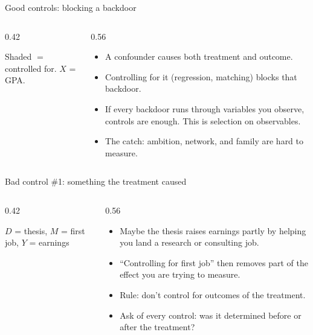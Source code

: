 \documentclass[aspectratio=169,11pt]{beamer}
\begin{document}
\begin{frame}{Good controls: blocking a backdoor}
\begin{columns}
\begin{column}{0.42\textwidth}
\begin{center}
\end{center}
\smallskip
{\small Shaded $=$ controlled for. $X$ = GPA.}
\end{column}
\begin{column}{0.56\textwidth}
\begin{itemize}
	\item A \alert{confounder} causes both treatment and outcome.
	\item Controlling for it (regression, matching) \alert{blocks} that backdoor.
	\item If every backdoor runs through variables you observe, controls are enough. This is \alert{selection on observables}.
	\item The catch: ambition, network, and family are hard to measure.
\end{itemize}
\end{column}
\end{columns}
\end{frame}


\begin{frame}{Bad control \#1: something the treatment caused}
\begin{columns}
\begin{column}{0.42\textwidth}
\begin{center}
\end{center}
\smallskip
{\small $D$ = thesis, $M$ = first job, $Y$ = earnings}
\end{column}
\begin{column}{0.56\textwidth}
\begin{itemize}
	\item Maybe the thesis raises earnings partly by helping you land a research or consulting job.
	\item ``Controlling for first job'' then \alert{removes part of the effect} you are trying to measure.
	\item Rule: \alert{don't control for outcomes of the treatment}.
	\item Ask of every control: was it determined \alert{before} or \alert{after} the treatment?
\end{itemize}
\end{column}
\end{columns}
\end{frame}
\end{document}
